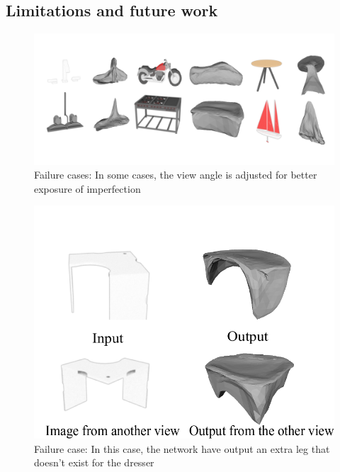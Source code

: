 \subsection{Limitations and future work}
\begin{figure}[htbp]
	\centering
	\includegraphics[width=\linewidth]{img/fail/fail1}
	\caption{Failure cases: In some cases, the view angle is adjusted for better exposure of imperfection}
	\label{fig:fail1}
\end{figure}
\begin{figure}[htbp]
	\centering
	\includegraphics[width=\linewidth]{img/fail/fail2}
	\caption{Failure case: In this case, the network have output an extra leg that doesn't exist for the dresser}
	\label{fig:fail2}
\end{figure}